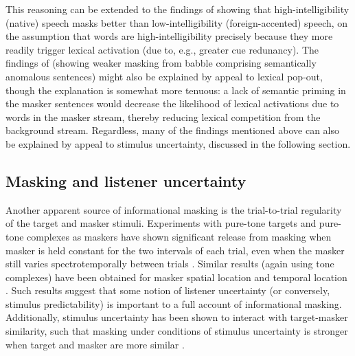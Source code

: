 This reasoning can be extended to the findings of \citeauthor{CalandruccioEtAl2010} showing that high-intelligibility (native) speech masks better than low-intelligibility (foreign-accented) speech, on the assumption that words are high-intelligibility precisely because they more readily trigger lexical activation (due to, e.g., greater cue redunancy).  The findings of \citeauthor{BrouwerEtAl2012} (showing weaker masking from babble comprising semantically anomalous sentences) might also be explained by appeal to lexical pop-out, though the explanation is somewhat more tenuous: a lack of semantic priming in the masker sentences would decrease the likelihood of lexical activations due to words in the masker stream, thereby reducing lexical competition from the background stream.  Regardless, many of the findings mentioned above can also be explained by appeal to stimulus uncertainty, discussed in the following section. %

\subsection{Masking and listener uncertainty\label{sec:uncertainty}}
Another apparent source of informational masking is the trial-to-trial regularity of the target and masker stimuli.  Experiments with pure-tone targets and pure-tone complexes as maskers have shown significant release from masking when masker is held constant for the two intervals of each trial, even when the masker still varies spectrotemporally between trials \citep{NeffGreen1987, NeffCallahan1988}.  Similar results (again using tone complexes) have been obtained for masker spatial location \citep{FanEtAl2008} and temporal location \citep{BoninoLeibold2008}.  Such results suggest that some notion of listener uncertainty (or conversely, stimulus predictability) is important to a full account of informational masking.  Additionally, stimulus uncertainty has been shown to interact with target-masker similarity, such that masking under conditions of stimulus uncertainty is stronger when target and masker are more similar \citep{DurlachEtAl2003b}.


